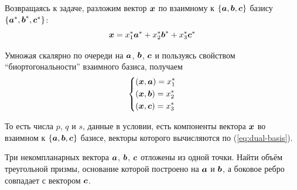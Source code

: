 \documentclass[a4paper,12pt]{article}
\begin{document}
\begin{solution}
    \bigskip
    
    Возвращаясь к задаче, разложим вектор $\boldsymbol x$ по взаимному к $\{\boldsymbol a, \boldsymbol b, \boldsymbol c\}$ базису $\{\boldsymbol a^*, \boldsymbol b^*, \boldsymbol c^*\}$:
    \[
      \boldsymbol x = x_1^* \boldsymbol a^* + x_2^* \boldsymbol b^* + x_3^* \boldsymbol c^*
    \]
    
    Умножая скалярно по очереди на $\boldsymbol a$, $\boldsymbol b$, $\boldsymbol c$ и пользуясь свойством ``биортогональности'' взаимного базиса, получаем
    \[
      \left\{
        \begin{aligned}
          &(\boldsymbol x, \boldsymbol a) = x_1^*\\
          &(\boldsymbol x, \boldsymbol b) = x_2^*\\
          &(\boldsymbol x, \boldsymbol c) = x_3^*
        \end{aligned}
      \right.
    \]
    
    То есть числа $p$, $q$ и $s$, данные в условии, есть компоненты вектора $\boldsymbol x$ во взаимном к $\{\boldsymbol a, \boldsymbol b, \boldsymbol c\}$ базисе, векторы которого вычисляются по (\ref{eq:dual-basis}).
  \end{solution}
  
  
  
  \begin{problem}[3.22(1)]
    Три некомпланарных вектора $\boldsymbol a$, $\boldsymbol b$, $\boldsymbol c$ отложены из одной точки.
    Найти объём треугольной призмы, основание которой построено на $\boldsymbol a$ и $\boldsymbol b$, а боковое ребро совпадает с вектором $\boldsymbol c$.
  \end{problem}
  
\end{document}
